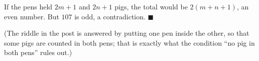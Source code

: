 If the pens held $2m+1$ and $2n+1$ pigs, the total would be $2(m+n+1)$, an even number. But $107$ is odd, a contradiction. $\blacksquare$

(The riddle in the post is answered by putting one pen inside the other, so that some pigs are counted in both pens; that is exactly what the condition ``no pig in both pens'' rules out.)
